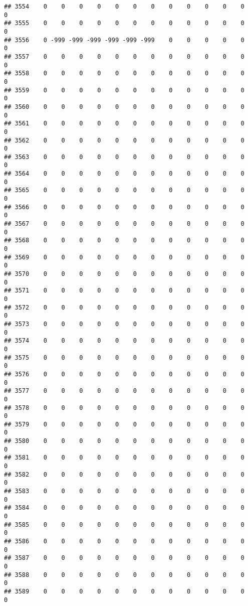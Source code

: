 \documentclass[]{article}
\begin{document}
\begin{verbatim}
## 3554    0    0    0    0    0    0    0    0    0    0    0    0    0
## 3555    0    0    0    0    0    0    0    0    0    0    0    0    0
## 3556    0 -999 -999 -999 -999 -999 -999    0    0    0    0    0    0
## 3557    0    0    0    0    0    0    0    0    0    0    0    0    0
## 3558    0    0    0    0    0    0    0    0    0    0    0    0    0
## 3559    0    0    0    0    0    0    0    0    0    0    0    0    0
## 3560    0    0    0    0    0    0    0    0    0    0    0    0    0
## 3561    0    0    0    0    0    0    0    0    0    0    0    0    0
## 3562    0    0    0    0    0    0    0    0    0    0    0    0    0
## 3563    0    0    0    0    0    0    0    0    0    0    0    0    0
## 3564    0    0    0    0    0    0    0    0    0    0    0    0    0
## 3565    0    0    0    0    0    0    0    0    0    0    0    0    0
## 3566    0    0    0    0    0    0    0    0    0    0    0    0    0
## 3567    0    0    0    0    0    0    0    0    0    0    0    0    0
## 3568    0    0    0    0    0    0    0    0    0    0    0    0    0
## 3569    0    0    0    0    0    0    0    0    0    0    0    0    0
## 3570    0    0    0    0    0    0    0    0    0    0    0    0    0
## 3571    0    0    0    0    0    0    0    0    0    0    0    0    0
## 3572    0    0    0    0    0    0    0    0    0    0    0    0    0
## 3573    0    0    0    0    0    0    0    0    0    0    0    0    0
## 3574    0    0    0    0    0    0    0    0    0    0    0    0    0
## 3575    0    0    0    0    0    0    0    0    0    0    0    0    0
## 3576    0    0    0    0    0    0    0    0    0    0    0    0    0
## 3577    0    0    0    0    0    0    0    0    0    0    0    0    0
## 3578    0    0    0    0    0    0    0    0    0    0    0    0    0
## 3579    0    0    0    0    0    0    0    0    0    0    0    0    0
## 3580    0    0    0    0    0    0    0    0    0    0    0    0    0
## 3581    0    0    0    0    0    0    0    0    0    0    0    0    0
## 3582    0    0    0    0    0    0    0    0    0    0    0    0    0
## 3583    0    0    0    0    0    0    0    0    0    0    0    0    0
## 3584    0    0    0    0    0    0    0    0    0    0    0    0    0
## 3585    0    0    0    0    0    0    0    0    0    0    0    0    0
## 3586    0    0    0    0    0    0    0    0    0    0    0    0    0
## 3587    0    0    0    0    0    0    0    0    0    0    0    0    0
## 3588    0    0    0    0    0    0    0    0    0    0    0    0    0
## 3589    0    0    0    0    0    0    0    0    0    0    0    0    0

\end{verbatim}
\end{document}
